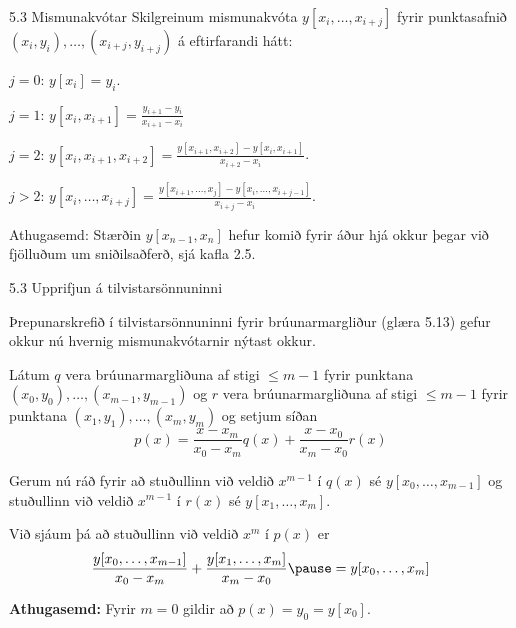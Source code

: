 \begin{frame}{5.3 Mismunakvótar}
 Skilgreinum mismunakvóta $y[x_i,\ldots,x_{i+j}]$ fyrir punktasafnið
 $(x_i,y_i),\ldots,(x_{i+j},y_{i+j})$ á eftirfarandi hátt:

 \pause
 \begin{block}{$j=0$:}
  $y[x_i] = y_i$.
 \end{block}
 \pause
 \begin{block}{$j=1$:}
  $y[x_i,x_{i+1}] = \frac{y_{i+1}-y_i}{x_{i+1}-x_i}$
 \end{block}
 
 \pause
 \begin{block}{$j=2$:}
 $y[x_i,x_{i+1},x_{i+2}] = \frac{y[x_{i+1},x_{i+2}] - y[x_i,x_{i+1}]}{x_{i+2}-x_i}$.
 \end{block}
 
 \pause
 \begin{block}{$j>2$:}
  $y[x_i,\ldots,x_{i+j}] = \frac{y[x_{i+1},\ldots,x_j] - y[x_i,\ldots,x_{i+j-1}]}{x_{i+j}-x_i}$.
  \end{block}
  \pause

  \begin{block}{Athugasemd:} 
  Stærðin $y[x_{n-1},x_n]$ hefur komið fyrir áður hjá okkur þegar við fjölluðum
  um sniðilsaðferð, sjá kafla 2.5.
\end{block}

\end{frame}


\begin{frame}{5.3 Upprifjun á tilvistarsönnuninni} 

Þrepunarskrefið í tilvistarsönnuninni fyrir brúunarmargliður (glæra 5.13)
gefur okkur nú hvernig mismunakvótarnir nýtast okkur.

\pause
\smallskip
Látum $q$ vera brúunarmargliðuna 
af stigi $\leq m-1$ fyrir punktana $(x_0,y_0), \ldots,
(x_{m-1},y_{m-1})$  og $r$ vera  brúunarmargliðuna af stigi $\leq m-1$
fyrir punktana $(x_1,y_1), \ldots, (x_m,y_m)$ og setjum síðan
\begin{equation*}
  p(x) = \frac{x-x_m}{x_0-x_m}q(x) + \frac{x-x_0}{x_m-x_0}r(x)
\end{equation*}

Gerum nú ráð fyrir að stuðullinn við veldið $x^{m-1}$ í $q(x)$ sé $y[x_0, \ldots, x_{m-1}]$
og stuðullinn við veldið $x^{m-1}$ í $r(x)$ sé $y[x_1, \ldots, x_m]$.

\pause
\smallskip
Við sjáum þá að stuðullinn við veldið
$x^m$ í $p(x)$ er
\begin{equation*}
  \frac{y[x_0, \ldots, x_{m-1}]}{x_0-x_m} + 
  \frac{y[x_1, \ldots, x_m]}{x_m - x_0}
  \pause
  = y[x_0, \ldots, x_m] 
\end{equation*}

\pause
\smallskip
 \textbf{Athugasemd:} Fyrir $m=0$ gildir að $p(x) = y_0 = y[x_0]$.

\end{frame}

